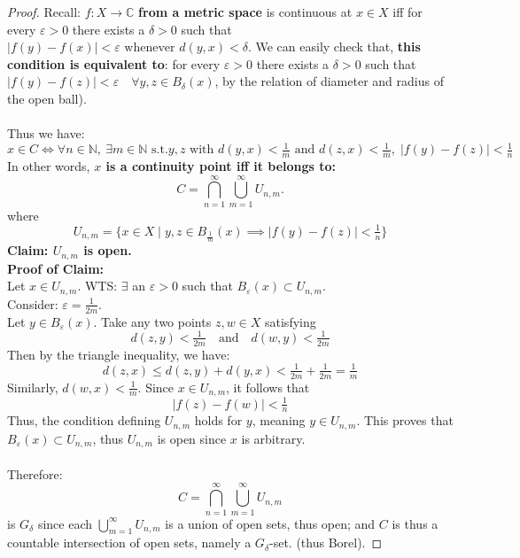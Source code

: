 \documentclass[lang=cn,11pt]{elegantbook}
\begin{document}
\begin{proof}
Recall: \(f\colon X\to\mathbb{C}\) \textbf{from a metric space} is continuous at \(x\in X\) iff for every \(\varepsilon > 0\) there exists a \(\delta > 0\) such that\( |f(y)-f(x)| < \varepsilon \text{ whenever } d(y,x) < \delta \).
We can easily check that, \textbf{this condition is equivalent to}: for every \(\varepsilon > 0\) there exists a \(\delta > 0\) such that \(|f(y)-f(z)| < \varepsilon \quad \forall y,z \in B_\delta(x)\), by the relation of diameter and radius of the open ball).\\\\
Thus we have: 
\[
x \in C \Longleftrightarrow \forall n\in\mathbb{N},\ \exists m\in\mathbb{N} \text{ s.t.} y,z \text{ with } d(y,x) < \tfrac{1}{m} \text{ and } d(z,x) < \tfrac{1}{m},\; |f(y)-f(z)| < \tfrac{1}{n}
\]
In other words, \textbf{\(x\) is a continuity point iff it belongs to:}
\[
C = \bigcap_{n=1}^\infty \bigcup_{m=1}^\infty U_{n,m}.
\] where \[
U_{n,m} = \Big\{x\in X \mid  y,z\in B_\frac{1}{m} (x)\implies |f(y)-f(z)| < \tfrac{1}{n}\Big\}
\]
\textbf{Claim: \(U_{n,m}\) is open.}\\
\textbf{Proof of Claim:}\\
Let \(x\in U_{n,m}\). WTS: $\exists$ an \(\varepsilon > 0\) such that \(B_\varepsilon(x) \subset U_{n,m}\).\\
Consider: \(\varepsilon = \tfrac{1}{2m}\). \\
Let \(y \in B_\varepsilon(x)\). Take any two points \(z,w \in X\) satisfying
\[
d(z,y) < \tfrac{1}{2m} \quad \text{and} \quad d(w,y) < \tfrac{1}{2m}
\]
Then by the triangle inequality, we have:
\[
d(z,x) \le d(z,y) + d(y,x) < \tfrac{1}{2m} + \tfrac{1}{2m} = \tfrac{1}{m}
\]
Similarly, \(d(w,x) < \tfrac{1}{m}\).  Since \(x \in U_{n,m}\), it follows that
\[
|f(z) - f(w)| < \tfrac{1}{n}
\]
Thus, the condition defining \(U_{n,m}\) holds for \(y\), meaning \(y \in U_{n,m}\).  This proves that \(B_\varepsilon(x) \subset U_{n,m}\), thus $U_{n,m}$ is open since $x$ is arbitrary.\\\\
Therefore:
\[
C = \bigcap_{n=1}^\infty \bigcup_{m=1}^\infty U_{n,m}
\] is $G_\delta$ since each $ \bigcup_{m=1}^\infty U_{n,m}$ is a union of open sets, thus open; and $C$ is thus a countable intersection of open sets, namely a \(G_\delta\)-set. (thus Borel).

\end{proof}

    
\end{document}
